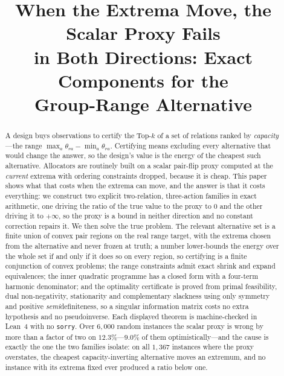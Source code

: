 



\title{When the Extrema Move, the Scalar Proxy Fails\\
in Both Directions: Exact Components for the\\
Group-Range Alternative}

\author{
}

\maketitle

\begin{abstract}
A design buys observations to certify the Top-$k$ of a set of relations ranked by
\emph{capacity}---the range $\max_{a}\theta_{ra}-\min_{a}\theta_{ra}$. Certifying means
excluding every alternative that would change the answer, so the design's value is the energy
of the cheapest such alternative. Allocators are routinely built on a scalar pair-flip proxy
computed at the \emph{current} extrema with ordering constraints dropped, because it is
cheap. This paper shows what that costs when the extrema can move, and the answer is that it
costs everything: we construct two explicit two-relation, three-action families in exact
arithmetic, one driving the ratio of the true value to the proxy to $0$ and the other driving
it to $+\infty$, so the proxy is a bound in neither direction and no constant correction
repairs it. We then solve the true problem. The relevant alternative set is a finite union of
convex pair regions on the real range target, with the extrema chosen from the alternative
and never frozen at truth; a number lower-bounds the energy over the whole set if and only if
it does so on every region, so certifying is a finite conjunction of convex problems; the
range constraints admit exact shrink and expand equivalences; the inner quadratic programme
has a closed form with a four-term harmonic denominator; and the optimality certificate is
proved from primal feasibility, dual non-negativity, stationarity and complementary slackness
using only symmetry and positive \emph{semi}definiteness, so a singular information matrix
costs no extra hypothesis and no pseudoinverse. Each displayed theorem is machine-checked in
Lean~4 with no \texttt{sorry}. Over $6{,}000$ random instances the scalar proxy is wrong by
more than a factor of two on $12.3\%$---$9.0\%$ of them optimistically---and the cause is
exactly the one the two families isolate: on all $1{,}367$ instances where the proxy
overstates, the cheapest capacity-inverting alternative moves an extremum, and no instance
with its extrema fixed ever produced a ratio below one.
\end{abstract}

